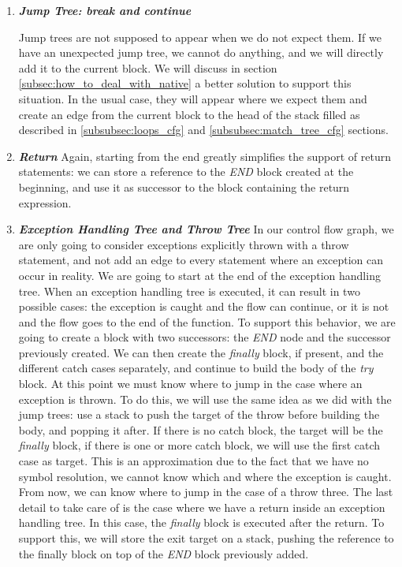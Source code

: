 \begin{enumerate}
	\item \textbf{\textit{Jump Tree: break and continue}} \newline 
	\label{subsubsec:jump_tree_cfg}
	
	Jump trees are not supposed to appear when we do not expect them.
	If we have an unexpected jump tree, we cannot do anything, and we will directly add it to the current block.
	We will discuss in section \ref{subsec:how_to_deal_with_native} a better solution to support this situation.
	In the usual case, they will appear where we expect them and create an edge from the current block to the head of the stack filled as described in \ref{subsubsec:loops_cfg} and \ref{subsubsec:match_tree_cfg} sections.
	
	\item \textbf{\textit{Return}} \newline 
	\label{subsubsec:return_cfg}
	Again, starting from the end greatly simplifies the support of return statements: we can store a reference to the \emph{END} block created at the beginning, and use it as successor to the block  containing the return expression.
	
	\item \textbf{\textit{Exception Handling Tree and Throw Tree}} \newline 
	\label{subsubsec:exception_handling_cfg}
	In our control flow graph, we are only going to consider exceptions explicitly thrown with a throw statement, and not add an edge to every statement where an exception can occur in reality. \newline
	We are going to start at the end of the exception handling tree. 
	When an exception handling tree is executed, it can result in two possible cases: the exception is caught and the flow can continue, or it is not and the flow goes to the end of the function. 
	To support this behavior, we are going to create a block with two successors: the \emph{END} node and the successor previously created. \newline
	We can then create the \emph{finally} block, if present, and the different catch cases separately, and continue to build the body of the \emph{try} block. 
	At this point we must know where to jump in the case where an exception is thrown. 
	To do this, we will use the same idea as we did with the jump trees: use a stack to push the target of the throw before building the body, and popping it after. 
	If there is no catch block, the target will be the \emph{finally} block, if there is one or more catch block, we will use the first catch case as target. 
	This is an approximation due to the fact that we have no symbol resolution, we cannot know which and where the exception is caught.
	From now, we can know where to jump in the case of a throw three.\newline
	The last detail to take care of is the case where we have a return inside an exception handling tree.
	In this case, the \emph{finally} block is executed after the return. 
	To support this, we will store the exit target on a stack, pushing the reference to the finally block on top of the \emph{END} block previously added.
	

\end{enumerate}
